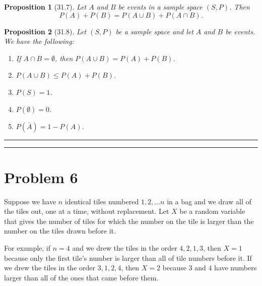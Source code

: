 \documentclass{article}
\newtheorem*{proposition}{Proposition} %
\theoremstyle{definition}
\newenvironment{solution}{\bigskip\hrule{\hfill}}{\bigskip\hrule{\hfill}} %
\begin{document}
\begin{proposition}[31.7]
    Let $A$ and $B$ be events in a sample space $\left(S,P\right)$. Then $$P\left(A\right)+P\left(B\right)=P\left(A\cup B\right)+P\left(A\cap B\right).$$
\end{proposition}
\begin{proposition}[31.8]
    Let $\left(S,P\right)$ be a sample space and let $A$ and $B$ be events. We have the following:
\begin{enumerate}[(1)] %
        \item If $A\cap B=\emptyset$, then $P\left(A\cup B\right)=P\left(A\right)+P\left(B\right)$.
        \item $P\left(A\cup B\right)\leq P\left(A\right)+P\left(B\right)$.
        \item $P\left(S\right)=1$.
        \item $P\left(\emptyset\right)=0$.
        \item $P\left(\overline{A}\right)=1-P\left(A\right)$.
    \end{enumerate}
\end{proposition}
\begin{solution}


\end{solution}


\newpage


\section*{Problem 6}

Suppose we have $n$ identical tiles numbered $1,2,\dots n$ in a bag and we draw all of the tiles out, one at a time, without replacement. Let $X$ be a random variable that gives the number of tiles for which the number on the tile is larger than the number on the tiles drawn before it. \medskip

For example, if $n=4$ and we drew the tiles in the order $4,2,1,3$, then $X=1$ because only the first tile's number is larger than all of tile numbers before it. If we drew the tiles in the order $3,1,2,4$, then $X=2$ because $3$ and $4$ have numbers larger than all of the ones that came before them. \medskip
\end{document}
